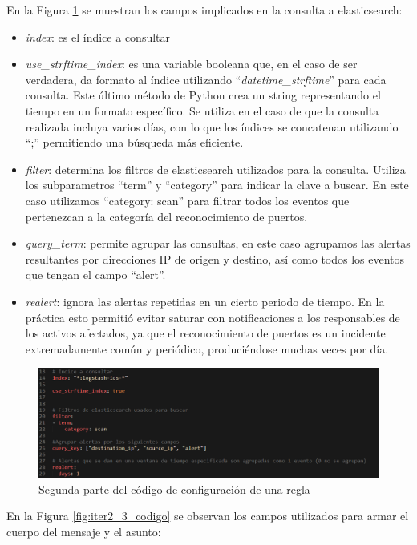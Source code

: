     \FloatBarrier
    En la Figura \ref{fig:iter2_2_codigo} se muestran los campos implicados en la consulta a elasticsearch:
    \begin{itemize}
        \item \textit{index}: es el índice a consultar
        \item \textit{use\_strftime\_index}: es una variable booleana que, en el caso de ser verdadera, da formato al índice utilizando “\textit{datetime\_strftime}” para cada consulta. Este último método de Python crea un string representando el tiempo en un formato específico. Se utiliza en el caso de que la consulta realizada incluya varios días, con lo que los índices se concatenan utilizando “;” permitiendo una búsqueda más eficiente.
        \item \textit{filter}: determina los filtros de elasticsearch utilizados para la consulta. Utiliza los subparametros “term”  y “category” para indicar la clave a buscar. En este caso utilizamos “category: scan” para filtrar todos los eventos que pertenezcan a la categoría del reconocimiento de puertos.
        \item \textit{query\_term}: permite agrupar las consultas, en este caso agrupamos las alertas resultantes por direcciones IP de origen y destino, así como todos los eventos que tengan el campo “alert”.
        \item \textit{realert}: ignora las alertas repetidas en un cierto periodo de tiempo. En la práctica esto permitió evitar saturar con notificaciones a los responsables de los activos afectados, ya que el reconocimiento de puertos es un incidente extremadamente común y periódico, produciéndose muchas veces por día.
    \end{itemize}
    \begin{figure}[H]
    \centering
        \includegraphics[width=1\textwidth]{./iteracion_2_imagenes/4-codigoAlerta2.png}
        \caption{Segunda parte del código de configuración de una regla}
        \label{fig:iter2_2_codigo}
    \end{figure}
    \FloatBarrier
    En la Figura \ref{fig:iter2_3_codigo} se observan los campos utilizados para armar el cuerpo del mensaje y el asunto:
